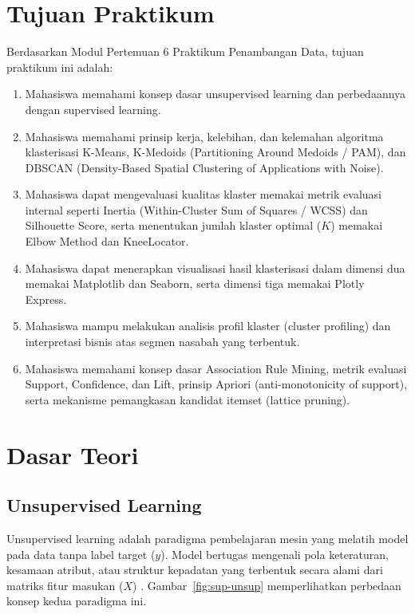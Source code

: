 \documentclass[a4paper,oneside,12pt]{report}
\begin{document}
\setcounter{page}{3}

\chapter[Tujuan Praktikum]{Tujuan Praktikum}
Berdasarkan Modul Pertemuan 6 Praktikum Penambangan Data, tujuan praktikum ini adalah:
\begin{enumerate}[noitemsep, topsep=4pt, parsep=2pt]
   \item Mahasiswa memahami konsep dasar unsupervised learning dan perbedaannya dengan supervised learning.
   \item Mahasiswa memahami prinsip kerja, kelebihan, dan kelemahan algoritma klasterisasi K-Means, K-Medoids (Partitioning Around Medoids / PAM), dan DBSCAN (Density-Based Spatial Clustering of Applications with Noise).
   \item Mahasiswa dapat mengevaluasi kualitas klaster memakai metrik evaluasi internal seperti Inertia (Within-Cluster Sum of Squares / WCSS) dan Silhouette Score, serta menentukan jumlah klaster optimal ($K$) memakai Elbow Method dan KneeLocator.
   \item Mahasiswa dapat menerapkan visualisasi hasil klasterisasi dalam dimensi dua memakai Matplotlib dan Seaborn, serta dimensi tiga memakai Plotly Express.
   \item Mahasiswa mampu melakukan analisis profil klaster (cluster profiling) dan interpretasi bisnis atas segmen nasabah yang terbentuk.
   \item Mahasiswa memahami konsep dasar Association Rule Mining, metrik evaluasi Support, Confidence, dan Lift, prinsip Apriori (anti-monotonicity of support), serta mekanisme pemangkasan kandidat itemset (lattice pruning).
\end{enumerate}

\clearpage

\chapter{Dasar Teori}

\section{Unsupervised Learning}
Unsupervised learning adalah paradigma pembelajaran mesin yang melatih model pada data tanpa label target ($y$). Model bertugas mengenali pola keteraturan, kesamaan atribut, atau struktur kepadatan yang terbentuk secara alami dari matriks fitur masukan ($X$) \cite{retnoningsih2020,santoso2021}. Gambar~\ref{fig:sup-unsup} memperlihatkan perbedaan konsep kedua paradigma ini.
\end{document}
